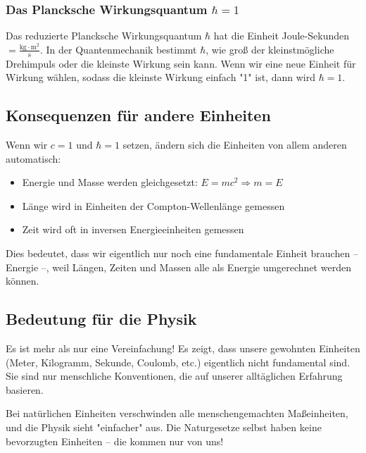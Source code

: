 \documentclass{article}
\begin{document}
	\subsubsection{Das Plancksche Wirkungsquantum $\hbar = 1$}
	Das reduzierte Plancksche Wirkungsquantum $\hbar$ hat die Einheit Joule-Sekunden $= \frac{\text{kg} \cdot \text{m}^2}{\text{s}}$. In der Quantenmechanik bestimmt $\hbar$, wie groß der kleinstmögliche Drehimpuls oder die kleinste Wirkung sein kann. Wenn wir eine neue Einheit für Wirkung wählen, sodass die kleinste Wirkung einfach "1" ist, dann wird $\hbar = 1$.
	
	\subsection{Konsequenzen für andere Einheiten}
	Wenn wir $c = 1$ und $\hbar = 1$ setzen, ändern sich die Einheiten von allem anderen automatisch:
	
	\begin{itemize}
		\item Energie und Masse werden gleichgesetzt: $E = mc^2 \Rightarrow m = E$
		\item Länge wird in Einheiten der Compton-Wellenlänge gemessen
		\item Zeit wird oft in inversen Energieeinheiten gemessen
	\end{itemize}
	
	Dies bedeutet, dass wir eigentlich nur noch eine fundamentale Einheit brauchen – Energie –, weil Längen, Zeiten und Massen alle als Energie umgerechnet werden können.
	
	\subsection{Bedeutung für die Physik}
	Es ist mehr als nur eine Vereinfachung! Es zeigt, dass unsere gewohnten Einheiten (Meter, Kilogramm, Sekunde, Coulomb, etc.) eigentlich nicht fundamental sind. Sie sind nur menschliche Konventionen, die auf unserer alltäglichen Erfahrung basieren.
	
	Bei natürlichen Einheiten verschwinden alle menschengemachten Maßeinheiten, und die Physik sieht "einfacher" aus. Die Naturgesetze selbst haben keine bevorzugten Einheiten – die kommen nur von uns!
	
\end{document}

